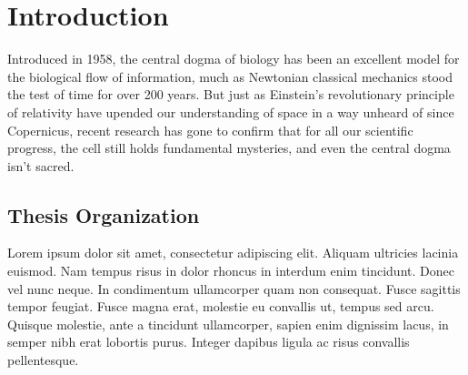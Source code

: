 
\chapter{Introduction}
\label{ch:intro}


Introduced in 1958, the central dogma of biology has been an excellent model for the biological flow of information, much as Newtonian classical mechanics stood the test of time for over 200 years. But just as Einstein’s revolutionary principle of relativity have upended our understanding of space in a way unheard of since Copernicus, recent research has gone to confirm that for all our scientific progress, the cell still holds fundamental mysteries, and even the central dogma isn’t sacred.

\section{Thesis Organization}
\label{sec:intro:thesisorg}

Lorem ipsum dolor sit amet, consectetur adipiscing elit. Aliquam ultricies lacinia euismod. Nam tempus risus in dolor rhoncus in interdum enim tincidunt. Donec vel nunc neque. In condimentum ullamcorper quam non consequat. Fusce sagittis tempor feugiat. Fusce magna erat, molestie eu convallis ut, tempus sed arcu. Quisque molestie, ante a tincidunt ullamcorper, sapien enim dignissim lacus, in semper nibh erat lobortis purus. Integer dapibus ligula ac risus convallis pellentesque.
